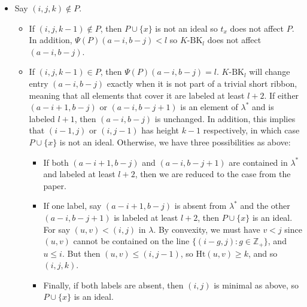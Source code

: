 \documentclass[10pt,letter]{article}
\begin{document}
\begin{itemize}
\begin{itemize}
\end{itemize}

\item Say $(i,j,k) \not \in P$. 
\begin{itemize}
\item If $(i,j,k-1) \not \in P$, then $P \cup \lbrace x \rbrace$ is not an ideal so $t_x$ does not affect $P$. In addition, $\Psi(P)(a-i,b-j) < l$ so $K$-$\text{BK}_l$ does not affect $(a-i,b-j)$.
\item If $(i,j,k-1) \in P$, then $\Psi(P)(a-i,b-j) = l$. $K$-$\text{BK}_l$ will change entry $(a-i,b-j)$ exactly when it is not part of a trivial short ribbon, meaning that all elements that cover it are labeled at least $l + 2$. If either $(a-i+1,b-j)$ or $(a-i,b-j+1)$ is an element of $\lambda^{\ast}$ and is labeled $l+1$, then $(a-i,b-j)$ is unchanged. In addition, this implies that $(i-1,j)$ or $(i,j-1)$ has height $k-1$ respectively, in which case $P \cup \lbrace x \rbrace$ is not an ideal. Otherwise, we have three possibilities as above:
\begin{itemize}
\item If both $(a-i+1,b-j)$ and $(a-i,b-j+1)$ are contained in $\lambda^{\ast}$ and labeled at least $l+2$, then we are reduced to the case from the paper.
\item If one label, say $(a-i+1,b-j)$ is absent from $\lambda^{\ast}$ and the other $(a-i,b-j+1)$ is labeled at least $l+2$, then $P \cup \lbrace x \rbrace$ is an ideal. For say $(u,v) < (i,j)$ in $\lambda$. By convexity, we must have $v < j$ since $(u,v)$ cannot be contained on the line $\lbrace (i-g,j): g \in \mathbb{Z}_+ \rbrace$, and $u \leq i$. But then $(u,v) \leq (i,j-1)$, so $\text{Ht}(u,v) \geq k$, and so $(i,j,k)$. 
\item Finally, if both labels are absent, then $(i,j)$ is minimal as above, so $P \cup \lbrace x \rbrace$ is an ideal.
\end{itemize} 
\end{itemize}
\end{itemize}
\end{document}
